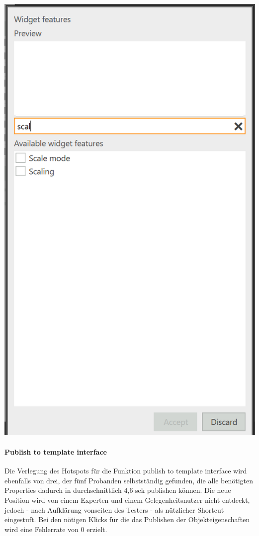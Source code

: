 \begin{center}
  \includegraphics[scale= 0.6]{figures/Feature_Test.PNG}
  \label{fig:Feature_Test}
\end{center}

\paragraph{Publish to template interface}
Die Verlegung des Hotspots für die Funktion \glqq publish to template interface\grqq{} wird ebenfalls von drei, der fünf Probanden selbstständig gefunden, die alle benötigten Properties dadurch in durchschnittlich 4,6 sek publishen können.
Die neue Position wird von einem Experten und einem Gelegenheitsnutzer nicht entdeckt, jedoch - nach Aufklärung vonseiten des Testers - als nützlicher Shortcut eingestuft.
Bei den nötigen Klicks für die das Publishen der Objekteigenschaften wird eine Fehlerrate von 0 erzielt.

